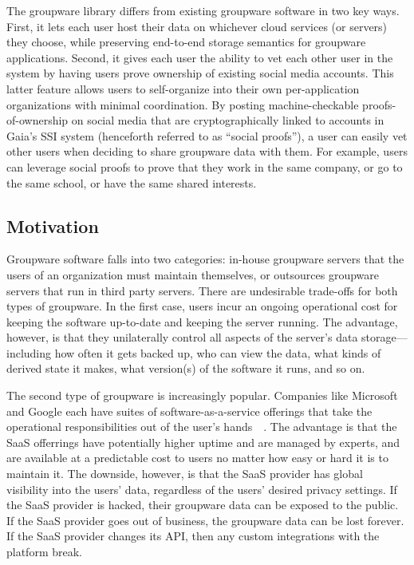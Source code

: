 The groupware library differs from existing groupware software in two key ways.
First, it lets each user host their data on whichever cloud services (or
servers) they choose, while preserving end-to-end storage semantics for
groupware applications.  Second, it gives each user the ability to vet each
other user in the system by having users prove ownership of existing social
media accounts.  This latter feature allows users to self-organize into their
own per-application organizations with minimal coordination.  By posting
machine-checkable proofs-of-ownership on social media that are cryptographically
linked to accounts in Gaia's SSI system (henceforth referred to as ``social
proofs''), a user can easily vet other users when deciding to share groupware
data with them.  For example, users can leverage social proofs to prove that
they work in the same company, or go to the same school, or have the same shared
interests.

\subsection{Motivation}

Groupware software falls into two categories:  in-house groupware servers that
the users of an organization must maintain themselves, or outsources groupware
servers that run in third party servers.  There are undesirable 
trade-offs for both types of groupware.  In the first case, users incur an
ongoing operational cost for keeping the software up-to-date and keeping the
server running.  The advantage, however, is that they unilaterally control all
aspects of the server's data storage---including how often it gets backed up,
who can view the data, what kinds of derived state it makes, what version(s) of
the software it runs, and so on.

The second type of groupware is increasingly popular.  Companies like Microsoft
and Google each have suites of software-as-a-service offerings that take the
operational responsibilities out of the user's
hands~\cite{gapps}~\cite{microsoft-apps}.  The advantage is that the
SaaS offerrings have potentially higher uptime and are managed by experts, and
are available at a predictable cost to users no matter how easy or hard it is to
maintain it.  The downside, however, is that the SaaS provider has global
visibility into the users' data, regardless of the users' desired privacy
settings.  If the SaaS provider is hacked, their groupware data can be exposed
to the public.  If the SaaS provider goes out of business, the groupware data
can be lost forever.  If the SaaS provider changes its API, then any custom
integrations with the platform break.

